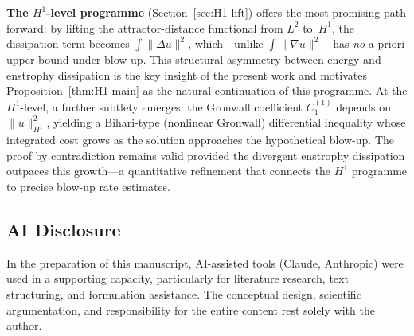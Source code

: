 \documentclass[12pt,a4paper]{article}
\theoremstyle{definition}
\theoremstyle{plain}
\theoremstyle{remark}
\begin{document}
\medskip\noindent
\textbf{The $H^1$-level programme} (Section~\ref{sec:H1-lift})
offers the most promising path forward: by lifting the
attractor-distance functional from $L^2$ to~$H^1$, the
dissipation term becomes $\int\|\Delta u\|^2$, which---unlike
$\int\|\nabla u\|^2$---has \emph{no} a priori upper bound
under blow-up.  This structural asymmetry between energy and
enstrophy dissipation is the key insight of the present work
and motivates Proposition~\ref{thm:H1-main} as the natural
continuation of this programme.
At the $H^1$-level, a further subtlety emerges: the Gronwall
coefficient $C_1^{(1)}$ depends on $\|u\|_{H^1}^2$, yielding a
Bihari-type (nonlinear Gronwall) differential inequality whose
integrated cost grows as the solution approaches the hypothetical
blow-up.  The proof by contradiction remains valid provided the
divergent enstrophy dissipation outpaces this growth---a
quantitative refinement that connects the $H^1$ programme to
precise blow-up rate estimates.

\subsection*{AI Disclosure}
In the preparation of this manuscript, AI-assisted tools (Claude, Anthropic)
were used in a supporting capacity, particularly for literature research,
text structuring, and formulation assistance.  The conceptual design,
scientific argumentation, and responsibility for the entire content
rest solely with the author.
\end{document}
